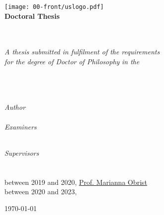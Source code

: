 \pagestyle{empty}
	\begin{center}

		\texttt{[image: 00-front/uslogo.pdf]}\\[1cm]%

		\textbf{\Large Doctoral Thesis}
	

		\Huge \textbf{\myTitle}\\[0.5cm] %
        \large \textbf{\mySubtitle}\\[2cm]
		\large \textit{A thesis submitted in fulfilment of the requirements\\ for the degree of Doctor of Philosophy} %
		\textit{in the}\\[1.2cm]
		\myDepartment\\ \myFaculty\\ \myUni\\[0.4cm]
		\vspace*{0.25cm}
		\begin{minipage}[t]{.39\linewidth}
			\begin{flushleft} %
			\emph{Author}\\
			\href{\myNameLink}{\myName}\\
			\emph{Examiners}\\
			\href{https://profiles.sussex.ac.uk/p145629-mary-agnes-krell/}{\myFirstExaminer} 	\\
			\href{https://frederic-bevilacqua.net/bio/bio-in-english/}{\mySecondExaminer}
			\end{flushleft}
		\end{minipage}
		\begin{minipage}[t]{.59\linewidth}
			\begin{flushright} %
			\emph{Supervisors}\\
			\href{https://profiles.sussex.ac.uk/p208667-chris-kiefer/}{\myFirstSupervisor} 		\\
			\href{https://profiles.sussex.ac.uk/p235751-cecile-chevalier/}{\mySecondSupervisor} \\
			between 2019 and 2020, \href{https://uclic.ucl.ac.uk/people/marianna-obrist}{Prof. Marianna Obrist} \\
			between 2020 and 2023, \href{https://profiles.sussex.ac.uk/p92444-jamie-ward}{\myThirdSupervisor}
			\end{flushright}
		\end{minipage}
		\vfill
		\large \today
	\end{center}
